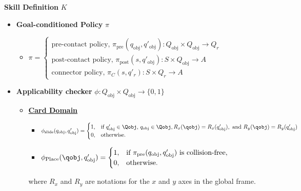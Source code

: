 
\noindent\hrulefill

\noindent \textbf{Skill Definition} $K$

\begin{itemize}\label{Def:NP}
    \item \textbf{Goal-conditioned Policy} \(\pi\)

    \begin{itemize}

        \item \(\pi = 
            \begin{cases} 
            \text{pre-contact policy, } \pi_\text{pre}(q_\text{obj}, q'_\text{obj}): Q_\text{obj} \times Q_\text{obj} \rightarrow Q_r\\
            \text{post-contact policy, } \pi_\text{post}(s, q'_\text{obj}): S \times Q_\text{obj} \rightarrow A \\
            \text{connector policy, } \pi_C(s, q'_r): S \times Q_r \rightarrow A

            \end{cases}\)
    \end{itemize}

    
    \item \textbf{Applicability checker} $\phi: Q_\text{obj} \times Q_\text{obj} \rightarrow \{0, 1\}$

    \begin{itemize}
        \item[] \underline{\textbf{Card Domain}}
        \begin{itemize}
            \item \(\phi_\text{slide}(q_\text{obj}, q'_\text{obj}) = 
            \begin{cases} 
            1, & \text{if } q'_\text{obj} \in \Qobj, \, q_\text{obj} \in \Qobj, R_x(\qobj)=R_x(q'_\text{obj}), \text{ and } R_y(\qobj)=R_y(q'_\text{obj})\\ 
            0, & \text{otherwise.} 
            \end{cases}\)
            \item \(\phi_\text{Place}(\qobj, q'_\text{obj}) = 
            \begin{cases} 
            1, & \text{if } \pi_\text{pre}(q_\text{obj}, q'_\text{obj}) \text{ is collision-free}, \\ 
            0, & \text{otherwise.} 
            \end{cases}\)
        \end{itemize}
        where \( R_x \) and \( R_y \) are notations for the \( x \) and \( y \) axes in the global frame.


\end{itemize}
\end{itemize}
